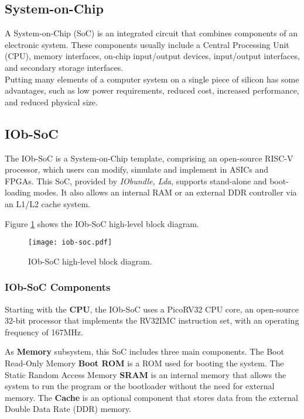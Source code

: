 
\subsection{System-on-Chip}
A System-on-Chip (SoC) is an integrated circuit that combines components of an electronic system. These components usually include a Central Processing Unit (CPU), memory interfaces, on-chip input/output devices, input/output interfaces, and secondary storage interfaces.\\
Putting many elements of a computer system on a single piece of silicon has some advantages, such as low power requirements, reduced cost, increased performance, and reduced physical size.
\vspace*{-0.05cm}
\subsection{IOb-SoC}
The IOb-SoC is a System-on-Chip template, comprising an open-source RISC-V processor, which users can modify, simulate and implement in ASICs and FPGAs.
This SoC, provided by \textit{IObundle, Lda}, supports stand-alone and boot-loading modes. It also allows an internal RAM or an external DDR controller via an L1/L2 cache system. 

Figure \ref{fig:iob} shows the IOb-SoC high-level block diagram.

\vspace{0.1cm}

\begin{figure}[H]
\centerline{\texttt{[image: iob-soc.pdf]}}
\caption{IOb-SoC high-level block diagram.}
\label{fig:iob}
\end{figure}

\subsubsection{IOb-SoC Components}
Starting with the \textbf{CPU}, the IOb-SoC uses a PicoRV32 CPU core, an open-source 32-bit processor that implements the RV32IMC instruction set, with an operating frequency of 167MHz.

As \textbf{Memory} subsystem, this SoC includes three main components. The Boot Read-Only Memory \textbf{Boot ROM} is a ROM used for booting the system. The Static Random Access Memory \textbf{SRAM} is an internal memory that allows the system to run the program or the bootloader without the need for external memory. The \textbf{Cache} is an optional component that stores data from the external Double Data Rate (DDR) memory.

